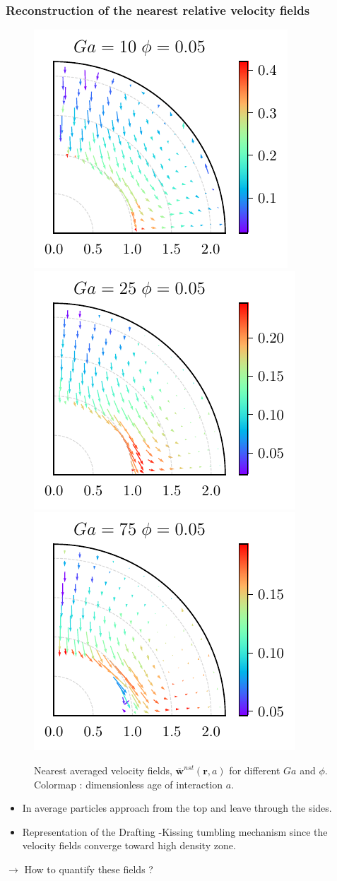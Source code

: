 \documentclass{sintefbeamer}
\newcommand{\nstavg}[1]{\overline{#1}^{nst}}
\begin{document}
\begin{frame}
  \frametitle{Reconstruction of the nearest relative velocity fields}

  \begin{figure}
    
    \includegraphics[height=0.25\textwidth]{image/HOMOGENEOUS/fDrop/U_mu_r_0_1_Ga_10_PHI_0_05.pdf}
    \includegraphics[height=0.25\textwidth]{image/HOMOGENEOUS/fDrop/U_mu_r_0_1_Ga_25_PHI_0_05.pdf}
    \includegraphics[height=0.25\textwidth]{image/HOMOGENEOUS/fDrop/U_mu_r_0_1_Ga_75_PHI_0_05.pdf}
    
    \caption{Nearest averaged velocity fields, $\nstavg{\textbf{w}} (\textbf{r},a)$ for different $Ga$ and $\phi$. 
    Colormap : dimensionless age of interaction $a$. }
  \end{figure}

\begin{itemize}
  \item In average particles approach from the top and leave through the sides. 
  \item Representation of the Drafting -Kissing tumbling mechanism since the velocity fields converge toward high density zone. 
\end{itemize}
$\rightarrow$ How to quantify these fields ?
\end{frame}
\end{document}
